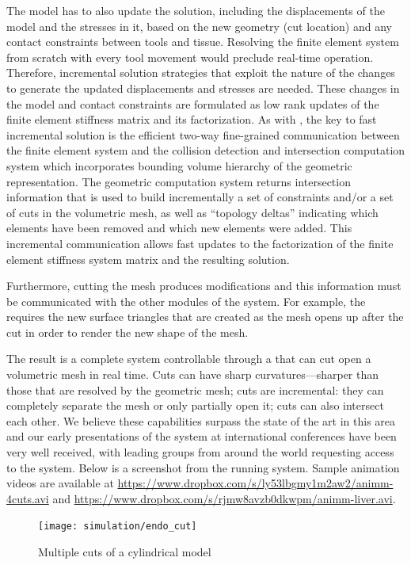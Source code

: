 The  model has to also update the solution, including the displacements of the model and the stresses in it, based on the new geometry (cut location) and any contact constraints between tools and tissue. Resolving the finite element system from scratch with every tool movement would preclude real-time operation. Therefore, incremental solution strategies that exploit the nature of the changes to generate the updated displacements and stresses are needed. These changes in the model and contact constraints are formulated as low rank updates of the finite element stiffness matrix and its factorization. As with , the key to fast incremental solution is the efficient two-way fine-grained communication between the finite element system and the collision detection and intersection computation system which incorporates bounding volume hierarchy of the geometric representation. The geometric computation system returns intersection information that is used to build incrementally a set of constraints and/or a set of cuts in the volumetric mesh, as well as \enquote{topology deltas} indicating which elements have been removed and which new elements were added. This incremental communication allows fast updates to the factorization of the finite element stiffness system matrix
 and the resulting solution.

Furthermore, cutting the mesh produces modifications and this information must be communicated with the other modules of the system.
For example, the  requires the new surface triangles that are created as the mesh opens up after the cut in order to render the new shape of the mesh.

The result is a complete system controllable through a  that can cut open a volumetric mesh in real time. Cuts can have sharp curvatures---sharper than those that are resolved by the geometric mesh; cuts are incremental: they can completely separate the  mesh or only partially open it; cuts can also intersect each other. We believe these capabilities surpass the state of the art in this area and our early presentations of the system at international conferences have been very well received, with leading groups from around the world requesting access to the system. Below is a screenshot from the running system. Sample animation videos are available at \url{https://www.dropbox.com/s/ly53lbgmy1m2aw2/animm-4cuts.avi} and \url{https://www.dropbox.com/s/rjmw8avzb0dkwpm/animm-liver.avi}.

\begin{figure}
	\centering%
	\texttt{[image: simulation/endo\_cut]}
	\caption{Multiple cuts of a cylindrical model}
	\label{fig:endo_cut}
\end{figure}

